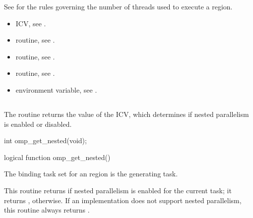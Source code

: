 See  
for the rules governing the number of threads used to 
execute a  region. 

\crossreferences
\begin{itemize}
\item {} ICV, see 
.

\item {} routine, see 
.

\item {} routine, see 
.

\item {} routine, see 
.

\item {} environment variable, see 
.
\end{itemize}








\subsection{}
\label{subsec:omp_get_nested}
\summary
The  routine returns the value of the  ICV, which 
determines if nested parallelism is enabled or disabled.

\ccppspecificstart
\begin{boxedcode}
int omp\_get\_nested(void);
\end{boxedcode}
\ccppspecificend

\fortranspecificstart
\begin{boxedcode}
logical function omp\_get\_nested()
\end{boxedcode}
\fortranspecificend

\binding
The binding task set for an  region is the generating task. 

\effect
This routine returns  if nested parallelism is enabled for the current task; it returns 
, otherwise. If an implementation does not support nested parallelism, this routine 
always returns .

